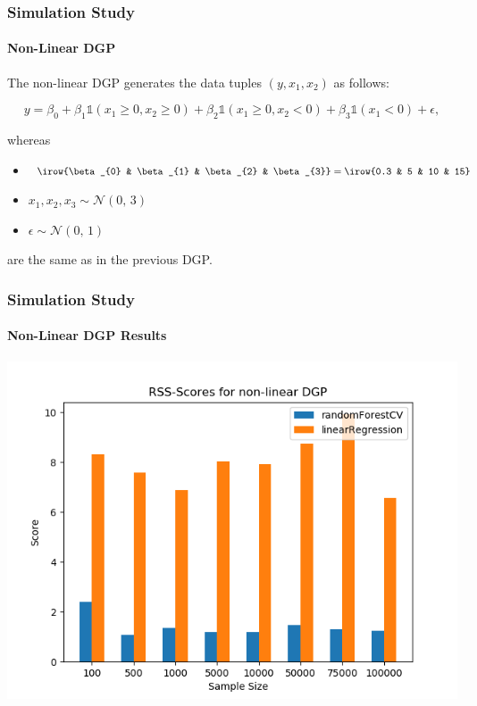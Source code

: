 \begin{frame}
    \frametitle{Simulation Study}
    \framesubtitle{Non-Linear DGP}
    The non-linear DGP generates the data tuples \( (y, x_{1}, x_{2}) \) as follows:

    \begin{equation}\label{eq:non_linear_dgp}
        y = \beta_{0} + \beta_{1} \mathds{1}(x_{1} \geq 0, x_{2} \geq 0) + \beta_{2} \mathds{1}(x_{1} \geq 0, x_{2} < 0) + \beta_{3} \mathds{1}(x_{1} < 0) + \epsilon,
    \end{equation}
    
    whereas
    \begin{itemize}
        \item $ \irow{\beta_{0} & \beta_{1} & \beta_{2} & \beta_{3}} = \irow{0.3 & 5 & 10 & 15}$
        \item $x_{1}, x_{2}, x_{3} \sim \mathcal{N}(0,\,3)$
        \item $\epsilon \sim \mathcal{N}(0,\,1)$
    \end{itemize}
    are the same as in the previous DGP.
\end{frame}

\begin{frame}
    \frametitle{Simulation Study}
    \framesubtitle{Non-Linear DGP Results}
	\begin{center}		
		\includegraphics[height=0.7\textheight]{images/forest_vs_ols_nonlinearDGP.png}
	\end{center}
\end{frame}
